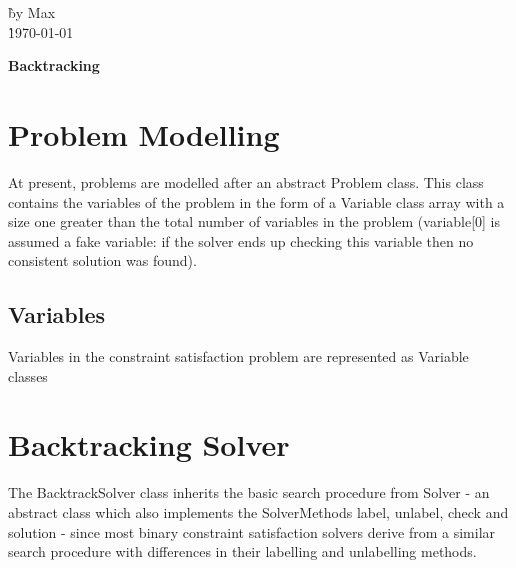 \documentclass{article}
\begin{document}
\begin{tabbing}
\` by Max\\
\` \today \\
\end{tabbing}
\begin{Large}
\begin{center}
{\bf Backtracking}
\end{center}
\end{Large}
\section*{Problem Modelling}
At present, problems are modelled after an abstract Problem class. This class contains the variables of the problem in the form of a Variable class array with a size one greater than the total number of variables in the problem (variable[0] is assumed a fake variable: if the solver ends up checking this variable then no consistent solution was found).
\subsection*{Variables}
Variables in the constraint satisfaction problem are represented as Variable classes
\section*{Backtracking Solver}
The BacktrackSolver class inherits the basic search procedure from Solver - an abstract class which also implements the SolverMethods label, unlabel, check and solution - since most binary constraint satisfaction solvers derive from a similar search procedure with differences in their labelling and unlabelling methods.
\end{document}
